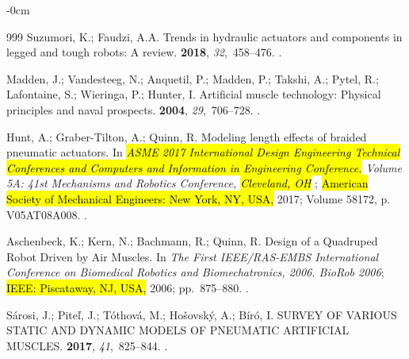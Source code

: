 \documentclass[actuators,article,accept,pdftex,moreauthors]{Definitions/mdpi}
\begin{document}
\begin{adjustwidth}{-\extralength}{0cm}
\begin{thebibliography}{999}
Suzumori, K.; Faudzi, A.A.
\newblock Trends in hydraulic actuators and components in legged and tough
  robots: A review.
 {\bf 2018}, {\em 32},~458--476.
.

Madden, J.; Vandesteeg, N.; Anquetil, P.; Madden, P.; Takshi, A.; Pytel, R.;
  Lafontaine, S.; Wieringa, P.; Hunter, I.
\newblock Artificial muscle technology: Physical principles and naval
  prospects.
 {\bf 2004}, {\em
  29},~706--728.
.

Hunt, A.; Graber-Tilton, A.; Quinn, R.
\newblock Modeling length effects of braided pneumatic actuators.
\newblock In \emph{\hl{ASME 2017 International Design Engineering Technical Conferences and Computers and Information in Engineering Conference.} %
 Volume {5A}: 41st {Mechanisms} and {Robotics}
  {Conference}, \hl{Cleveland, OH}%
};  \hl{American Society of Mechanical Engineers: New York, NY, USA,} %
 2017; Volume 58172, p. V05AT08A008.
.

Aschenbeck, K.; Kern, N.; Bachmann, R.; Quinn, R.
\newblock Design of a {Quadruped} {Robot} {Driven} by {Air} {Muscles}.
\newblock In \emph{The {First} {IEEE}/{RAS}-{EMBS} {International}
  {Conference} on {Biomedical} {Robotics} and {Biomechatronics}, 2006. {BioRob}
  2006};  \hl{IEEE: Piscataway, NJ, USA,} 2006; \mbox{pp. 875--880.}
.

Sárosi, J.; Piteľ, J.; Tóthová, M.; Hošovský, A.; Bíró, I.
 {SURVEY} {OF} {VARIOUS} {STATIC} {AND} {DYNAMIC}
  {MODELS} {OF} {PNEUMATIC} {ARTIFICIAL} {MUSCLES}.
  {\bf 2017}, {\em 41},~825--844.
.


\end{thebibliography}
\end{adjustwidth}
\end{document}
